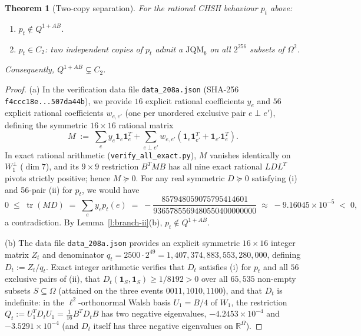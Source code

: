 \documentclass[11pt,a4paper]{article}
\newtheorem{theorem}{Theorem}
\theoremstyle{definition}
\theoremstyle{remark}
\newcommand{\ind}[1]{\mathbf{1}_{#1}}
\newcommand{\JQMb}{\mathrm{JQM}_b}
\newcommand{\QAB}{Q^{1+AB}}
\DeclareMathOperator{\tr}{tr}
\begin{document}
\begin{theorem}[Two-copy separation]\label{t:two-copy}
For the rational CHSH behaviour $p_t$ above:
\begin{enumerate}
  \item[(a)] $p_t \notin \QAB$.
  \item[(b)] $p_t \in C_2$: two independent copies of $p_t$ admit a $\JQMb$ on all $2^{256}$ subsets of $\Omega^2$.
\end{enumerate}
Consequently, $\QAB \subsetneq C_2$.
\end{theorem}

\begin{proof}
(a) In the verification data file \texttt{data\_208a.json} (SHA-256 \texttt{f4ccc18e...507da44b}), we provide $16$ explicit rational coefficients $y_e$ and $56$ explicit rational coefficients $w_{e,e'}$ (one per unordered exclusive pair $e \perp e'$), defining the symmetric $16 \times 16$ rational matrix
\[
  M \;:=\; \sum_{e} y_e \ind e \ind e^T + \sum_{e \perp e'} w_{e,e'}(\ind e \ind{e'}^T + \ind{e'} \ind e^T).
\]
In exact rational arithmetic (\texttt{verify\_all\_exact.py}), $M$ vanishes identically on $W_1^\perp$ ($\dim 7$), and its $9 \times 9$ restriction $B^T M B$ has all nine exact rational $LDL^T$ pivots strictly positive; hence $M \succeq 0$. For any real symmetric $D \succeq 0$ satisfying (i) and 56-pair (ii) for $p_t$, we would have
\[
  0 \;\le\; \tr(M D) \;=\; \sum_e y_e p_t(e) \;=\; -\frac{857948059075795414601}{9365785569480550400000000} \;\approx\; -9.16045 \times 10^{-5} \;<\; 0,
\]
a contradiction. By Lemma~\ref{l:branch-ii}(b), $p_t \notin \QAB$.

(b) The data file \texttt{data\_208a.json} provides an explicit symmetric $16 \times 16$ integer matrix $Z_t$ and denominator $q_t = 2500 \cdot 2^{49} = 1{,}407{,}374{,}883{,}553{,}280{,}000$, defining $D_t := Z_t / q_t$. Exact integer arithmetic verifies that $D_t$ satisfies (i) for $p_t$ and all $56$ exclusive pairs of (ii), that $D_t(\ind S, \ind S) \ge 1/8192 > 0$ over all $65{,}535$ non-empty subsets $S \subseteq \Omega$ (attained on the three events $0011, 1010, 1100$), and that $D_t$ is indefinite: in the $\ell^2$-orthonormal Walsh basis $U_1 = B/4$ of $W_1$, the restriction $Q_t := U_1^T D_t U_1 = \frac{1}{16} B^T D_t B$ has two negative eigenvalues, $-4.2453 \times 10^{-4}$ and $-3.5291 \times 10^{-4}$ (and $D_t$ itself has three negative eigenvalues on $\mathbb{R}^\Omega$).


\end{proof}
\end{document}
